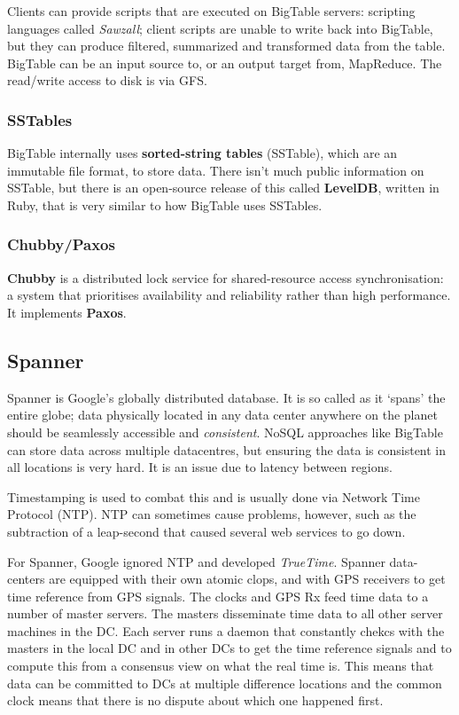 \documentclass[11pt,a4paper,titlepage,dvipsnames,cmyk]{scrartcl}
\begin{document}
Clients can provide scripts that are executed on BigTable servers: scripting languages called \textit{Sawzall}; client scripts are unable to write back into BigTable, but they can produce filtered, summarized and transformed data from the table. BigTable can be an input source to, or an output target from, MapReduce. The read/write access to disk is via GFS.

\subsubsection{SSTables}
BigTable internally uses \textbf{sorted-string tables} (SSTable), which are an immutable file format, to store data. There isn't much public information on SSTable, but there is an open-source release of this called \textbf{LevelDB}, written in Ruby, that is very similar to how BigTable uses SSTables.

\subsubsection{Chubby/Paxos}
\textbf{Chubby} is a distributed lock service for shared-resource access synchronisation: a system that prioritises availability and reliability rather than high performance. It implements \textbf{Paxos}.

\subsection{Spanner}
Spanner is Google's globally distributed database. It is so called as it `spans' the entire globe; data physically located in any data center anywhere on the planet should be seamlessly accessible and \textit{consistent}. NoSQL approaches like BigTable can store data across multiple datacentres, but ensuring the data is consistent in all locations is very hard. It is an issue due to latency between regions.

Timestamping is used to combat this and is usually done via Network Time Protocol (NTP). NTP can sometimes cause problems, however, such as the subtraction of a leap-second that caused several web services to go down.

For Spanner, Google ignored NTP and developed \textit{TrueTime}. Spanner data-centers are equipped with their own atomic clops, and with GPS receivers to get time reference from GPS signals. The clocks and GPS Rx feed time data to a number of master servers. The masters disseminate time data to all other server machines in the DC. Each server runs a daemon that constantly chekcs with the masters in the local DC and in other DCs to get the time reference signals and to compute this from a consensus view on what the real time is. This means that data can be committed to DCs at multiple difference locations and the common clock means that there is no dispute about which one happened first.
\end{document}
